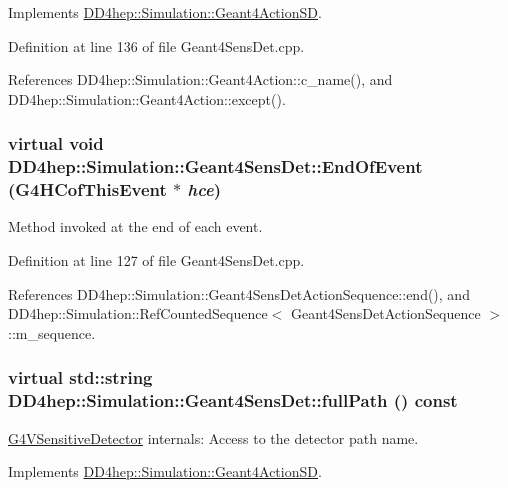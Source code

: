 Implements \hyperlink{class_d_d4hep_1_1_simulation_1_1_geant4_action_s_d_acb227bd17a6f30d5df564a4d19f3f8a2}{DD4hep::Simulation::Geant4ActionSD}.

Definition at line 136 of file Geant4SensDet.cpp.

References DD4hep::Simulation::Geant4Action::c\_\-name(), and DD4hep::Simulation::Geant4Action::except().\hypertarget{class_d_d4hep_1_1_simulation_1_1_geant4_sens_det_a37c49991840451bda97aa4640fcd1b4c}{
\subsubsection[{EndOfEvent}]{\setlength{\rightskip}{0pt plus 5cm}virtual void DD4hep::Simulation::Geant4SensDet::EndOfEvent (G4HCofThisEvent $\ast$ {\em hce})}}
\label{class_d_d4hep_1_1_simulation_1_1_geant4_sens_det_a37c49991840451bda97aa4640fcd1b4c}


Method invoked at the end of each event. 

Definition at line 127 of file Geant4SensDet.cpp.

References DD4hep::Simulation::Geant4SensDetActionSequence::end(), and DD4hep::Simulation::RefCountedSequence$<$ Geant4SensDetActionSequence $>$::m\_\-sequence.\hypertarget{class_d_d4hep_1_1_simulation_1_1_geant4_sens_det_a7abea9524758bf79778a0b32edb280ae}{
\subsubsection[{fullPath}]{\setlength{\rightskip}{0pt plus 5cm}virtual std::string DD4hep::Simulation::Geant4SensDet::fullPath () const}}
\label{class_d_d4hep_1_1_simulation_1_1_geant4_sens_det_a7abea9524758bf79778a0b32edb280ae}


\hyperlink{class_g4_v_sensitive_detector}{G4VSensitiveDetector} internals: Access to the detector path name. 

Implements \hyperlink{class_d_d4hep_1_1_simulation_1_1_geant4_action_s_d_afaba405dfb4c663ba2403ad4558d9956}{DD4hep::Simulation::Geant4ActionSD}.

